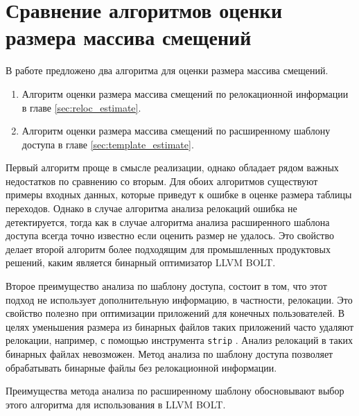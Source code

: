 \documentclass{mipt-thesis-bs}
\begin{document}
    \section{Сравнение алгоритмов оценки размера массива смещений} \label{sec:estimate-comparision}
    В работе предложено два алгоритма для оценки размера массива смещений.
    \begin{enumerate}
        \item Алгоритм оценки размера массива смещений по релокационной информации в главе \ref{sec:reloc_estimate}.
        \item Алгоритм оценки размера массива смещений по расширенному шаблону доступа в главе \ref{sec:template_estimate}.
    \end{enumerate}
    Первый алгоритм проще в смысле реализации, однако обладает рядом важных недостатков по сравнению со вторым. Для обоих алгоритмов существуют примеры входных данных, которые приведут к ошибке в оценке размера таблицы переходов. Однако в случае алгоритма анализа релокаций ошибка не детектируется, тогда как в случае алгоритма анализа расширенного шаблона доступа всегда точно известно если оценить размер не удалось. Это свойство делает второй алгоритм более подходящим для промышленных продуктовых решений, каким является бинарный оптимизатор LLVM BOLT.

    Второе преимущество анализа по шаблону доступа, состоит в том, что этот подход не использует дополнительную информацию, в частности, релокации. Это свойство полезно при оптимизации приложений для конечных пользователей. В целях уменьшения размера из бинарных файлов таких приложений часто удаляют релокации, например, с помощью инструмента \verb|strip| \cite{strip}. Анализ релокаций в таких бинарных файлах невозможен. Метод анализа по шаблону доступа позволяет обрабатывать бинарные файлы без релокационной информации.

    Преимущества метода анализа по расширенному шаблону обосновывают выбор этого алгоритма для использования в LLVM BOLT.
\end{document}
